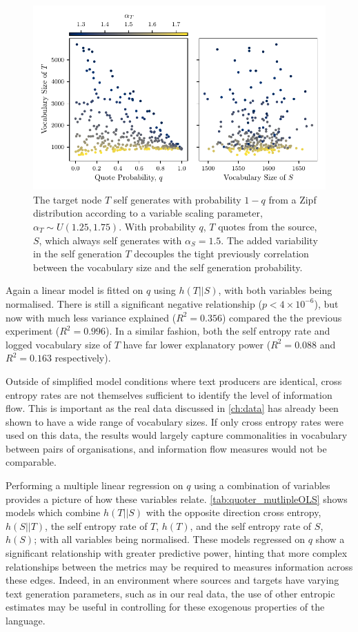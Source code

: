 \begin{figure}[!htbp]
\centering
\includegraphics{chapter3/figs/VariableAlphaVocabSize.pdf}
\caption{The target node $T$ self generates with probability $1-q$ from a Zipf distribution according to a variable scaling parameter, $\alpha_T \sim U(1.25, 1.75)$. With probability $q$, $T$ quotes from the source, $S$, which always self generates with $\alpha_S = 1.5$. The added variability in the self generation $T$ decouples the tight previously correlation between the vocabulary size and the self generation probability. }\label{fig:flow_variablealphascatterplot}
\end{figure}

Again a linear model is fitted on $q$ using $h(T||S)$, with both variables being normalised. There is still a significant negative relationship ($p< 4\times10^{-6}$), but now with much less variance explained ($R^2 = 0.356$) compared the the previous experiment ($R^2=0.996$). In a similar fashion, both the self entropy rate and logged vocabulary size of $T$ have far lower explanatory power ($R^2=0.088$ and $R^2=0.163$ respectively).

Outside of simplified model conditions where text producers are identical, cross entropy rates are not themselves sufficient to identify the level of information flow. This is important as the real data discussed in \autoref{ch:data} has already been shown to have a wide range of vocabulary sizes. If only cross entropy rates were used on this data, the results would largely capture commonalities in vocabulary between pairs of organisations, and information flow measures would not be comparable. 

Performing a multiple linear regression on $q$ using a combination of variables provides a picture of how these variables relate. \autoref{tab:quoter_mutlipleOLS} shows models which combine $h(T||S)$ with the opposite direction cross entropy, $h(S||T)$, the self entropy rate of $T$, $h(T)$, and the self entropy rate of $S$, $h(S)$; with all variables being normalised. These models regressed on $q$ show a significant relationship with greater predictive power, hinting that more complex relationships between the metrics may be required to measures information across these edges. Indeed, in an environment where sources and targets have varying text generation parameters, such as in our real data, the use of other entropic estimates may be useful in controlling for these exogenous properties of the language. 


